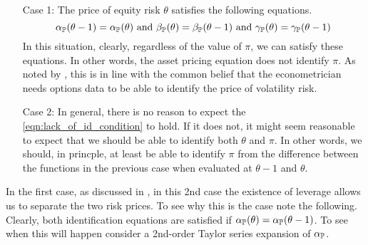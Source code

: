 \documentclass[11pt, letterpaper, twoside, final]{article}
\begin{document}
\begin{enumerate}
    \item[Case 1:] The price of equity risk $\theta$ satisfies the following equations. 
        \begin{equation}
            \alpha_{\PP}(\theta - 1) = \alpha_{\PP}(\theta)\ \text{and}\ \beta_{\PP}(\theta) = \beta_{\PP}(\theta
            -1)\ \text{and}\ \gamma_{\PP}(\theta) = \gamma_{\PP}(\theta - 1)
            \label{eqn:lack_of_id_condition}
        \end{equation}
        In this situation, clearly, regardless of the value of $\pi$, we can satisfy these equations.
        In other words, the asset pricing equation does not identify $\pi$. 
        As noted by \textcite{khrapov2016affine}, this is in line with the common belief that the econometrician
        needs options data to be able to identify the price of volatility risk. 
    \item[Case 2:] 
        In general, there is no reason to expect the \cref{eqn:lack_of_id_condition} to hold.
        If it does not, it might seem reasonable to expect that we should be able to identify both $\theta$ and
        $\pi$.
        In other words, we should, in princple, at least be able to identify $\pi$ from the difference between the
        functions in the previous case when evaluated at $\theta-1$ and $\theta$.
\end{enumerate}


In the first case, as discussed in \textcite[13]{khrapov2016affine}, in this 2nd case the existence of leverage
allows us to separate the two risk prices.
To see why this is the case note the following.
Clearly, both identification equations are satisfied if $\alpha_{\mathbb{P}}(\theta) = \alpha_{\mathbb{P}}(\theta -1)$.
To see when this will happen consider a 2nd-order Taylor series expansion of $\alpha_{\mathbb{P}}$.
\end{document}
